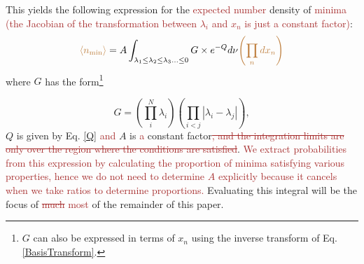 \documentclass[12pt]{article}
\newcommand{\re}[1]{\textcolor{blue}{[{\bf RE}: #1]}}
\newcommand{\sh}[1]{\textcolor{brown}{#1}}
\begin{document}
This yields the following expression for the \sh{expected number} density of \sh{minima (the Jacobian of the transformation between $\lambda_i$ and $x_n$ is just a constant factor)}:
%
\begin{equation} \label{DensityOfPeaks}
\sh{\langle n_{{\rm min}} \rangle} = A \int_{\lambda_1 \leq \lambda_2 \leq \lambda_3 \ldots \leq 0} G \times e^{-Q} d\nu \sh{\left(\prod_n dx_n\right)}
\end{equation}
%
\noindent where $G$ has the form\footnote{$G$ can also be expressed in terms of $x_n$ using the inverse transform of Eq. \ref{BasisTransform}.}

\begin{equation}
G = \left(\prod_{i}^{N} \lambda_i \right)\left(\prod_{i<j} |\lambda_i-\lambda_j|\right),
\end{equation} 
%
$Q$ is given by Eq. \ref{Q} \sh{and} $A$ is \sh{a} constant factor\sh{\sout{, and the integration limits are only over the region where the conditions are satisfied}}. \sh{We extract probabilities from this expression by calculating the proportion of minima satisfying various properties, hence we do not need to determine $A$ explicitly because it cancels when we take ratios to determine proportions.} Evaluating this integral will be the focus of \sh{\sout{much} most} of the remainder of this paper.


\end{document}
